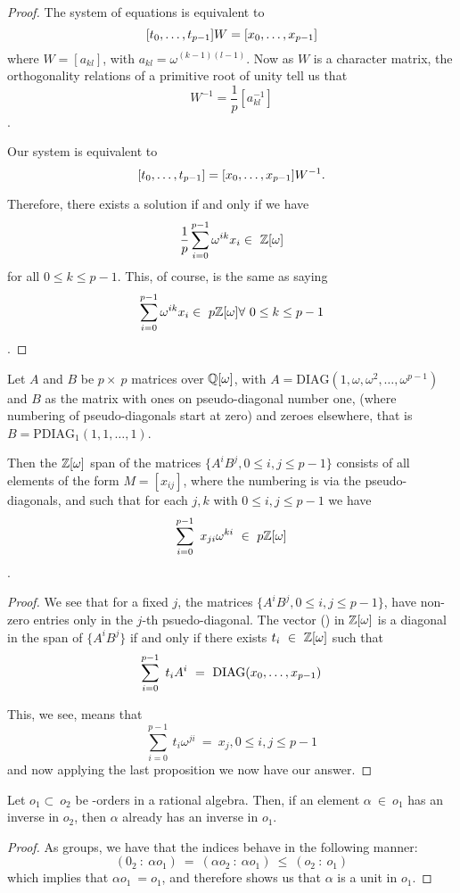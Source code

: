 \documentclass[11pt]{report}
\begin{document}
\begin{proof}
The system of equations is equivalent to
\[[\series[t]{0}{p-1}]W = [\series{0}{p-1}]\]
where $W= [a_{kl}]$, with \(a_{kl} = \omega^{(k-1)(l-1)}\). Now as $W$ is a character matrix, the
orthogonality relations of a primitive root of unity tell us that\[W^{-1} = \frac{1}{p}[a_{kl}^{-1}]\].

Our system is equivalent to \[[\series[t]{0}{p-1}] = [\series{0}{p-1}]W^{-1}.\]


Therefore, there exists a solution if and only if we have
\[\frac{1}{p}\sum_{i=0}^{p-1}\omega^{ik}x_i \in\ \integers[\omega]\] for all \(0\leq{}k\leq{}p-1\).
This, of course, is the same as saying \[\sum_{i=0}^{p-1}\omega^{ik}x_i \in\
p\integers[\omega]\forall{}\ 0\leq{}k\leq{}p-1\].
\end{proof}

\begin{proposition}

Let $A$ and $B$ be $p \times\ p$ matrices over $\rat[\omega]$, with $A = \mathrm{DIAG}(1, \omega, 
\omega^2, \ldots, \omega^{p-1})$ and $B$ as the matrix with ones
on pseudo-diagonal number one, (where numbering of pseudo-diagonals start at zero) and zeroes
elsewhere, that is $B = \mathrm{PDIAG}_1(1, 1, \ldots, 1)$.

Then the $\integers[\omega]$ span of the matrices $\{A^iB^j, 0\leq{}i,j\leq{}p-1\}$ consists of all elements of the form $M= [x_{ij}]$,
where the numbering is via the pseudo-diagonals, and such that for each $j,k$ with  $0\leq{}i,j\leq{}p-1$
 we have\[\sum_{i=0}^{p-1}\ x_{ji}\omega^{ki}\  \in\ p\integers[\omega]\].
\end{proposition}

\begin{proof}

We see that for a fixed $j$, the matrices $\{A^iB^j, 0\leq{}i,j\leq{}p-1\}$, have non-zero entries only in the $j$-th
psuedo-diagonal. The vector (\series{0}{p-1}) in $\integers[\omega]$ is a diagonal in the span of $\{A^iB^j\}$ if and only
if there exists $t_i\ \in\ \integers[\omega]$ such that
\[\sum_{i=0}^{p-1}\ t_iA^i\ = \ \mathrm{DIAG}(\series{0}{p-1})\]

This, we see, means that\[\sum_{i=0}^{p-1}\ t_i\omega^{ji}\ = \ x_j, 0\leq{}i,j\leq{}p-1 \]
and now applying the last proposition we now have our answer.
\end{proof}

\begin{proposition}

Let $o_1 \subset\ o_2$ be \integers-orders in a rational algebra. Then, if an element $\alpha\ \in\ o_1$
 has  an inverse in $o_2$,
then $\alpha$ already has an inverse in $o_1$.
\end{proposition}
\begin{proof}

As groups, we have that the indices behave in the following manner:
\[(0_2\ :\ \alpha{}o_1)\ =\ (\alpha{}o_2\ :\ \alpha{}o_1)\ \leq{}\  (o_2\ :\ o_1)\]
which implies that $\alpha{}o_1 \ = o_1$, and therefore shows us that $\alpha$ is a unit in $o_1$.
\end{proof}
\end{document}

